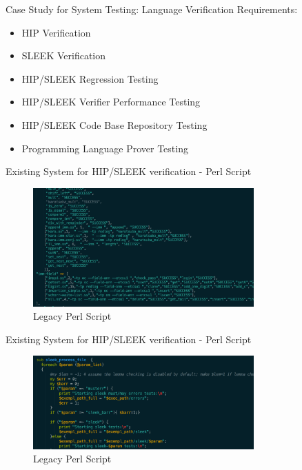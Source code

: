 \begin{frame}{Case Study for System Testing: Language Verification}
Requirements:
\begin{itemize}
  \item {HIP Verification}
  \item {SLEEK Verification}
  \item {HIP/SLEEK Regression Testing}
  \item {HIP/SLEEK Verifier Performance Testing}
  \item {HIP/SLEEK Code Base Repository Testing}
  \item {Programming Language Prover Testing}
  \end{itemize}
\end{frame}

\begin{frame}{Existing System for HIP/SLEEK verification - Perl Script}
    \begin{figure}[H]
  \centering
    \includegraphics[width=320px]{figures/legacy1.png}
  \caption{Legacy Perl Script}
\end{figure}
\end{frame}

\begin{frame}{Existing System for HIP/SLEEK verification - Perl Script}
    \begin{figure}[H]
    \centering
    \includegraphics[width=320px]{figures/legacy2.png}
  \caption{Legacy Perl Script}
\end{figure}
\end{frame}

